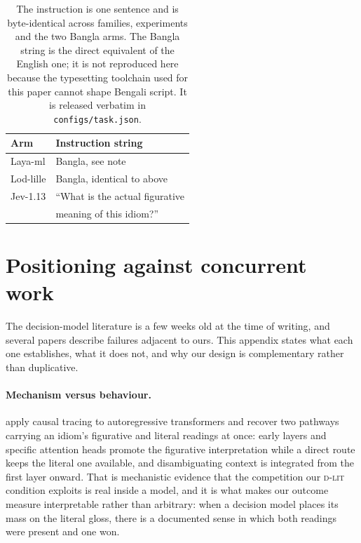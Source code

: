 \documentclass[11pt]{article}
\newcommand{\laya}[1]{\cellcolor{fLaya}#1}
\newcommand{\lod}[1]{\cellcolor{fLod}#1}
\newcommand{\jev}[1]{\cellcolor{fJev}#1}
\newcommand{\Dlit}{\textsc{d-lit}}
\begin{document}
\begin{table}[h]
\centering\small
\setlength{\tabcolsep}{4pt}
\begin{tabular}{ll}
\toprule
\textbf{Arm} & \textbf{Instruction string} \\
\midrule
\laya{Laya-ml} & \laya{Bangla, see note} \\
\lod{Lod-lille} & \lod{Bangla, identical to above} \\
\jev{Jev-1.13} & \jev{``What is the actual figurative} \\
\jev{} & \jev{meaning of this idiom?''} \\
\bottomrule
\end{tabular}
\caption{The instruction is one sentence and is byte-identical across families,
experiments and the two Bangla arms. The Bangla string is the direct equivalent
of the English one; it is not reproduced here because the typesetting toolchain
used for this paper cannot shape Bengali script. It is released verbatim in
\texttt{configs/task.json}.}
\label{tab:instr}
\end{table}

\section{Positioning against concurrent work}
\label{app:position}

The decision-model literature is a few weeks old at the time of writing, and
several papers describe failures adjacent to ours. This appendix states what
each one establishes, what it does not, and why our design is complementary
rather than duplicative.

\paragraph{Mechanism versus behaviour.} \citet{oh2026tug} apply causal tracing
to autoregressive transformers and recover two pathways carrying an idiom's
figurative and literal readings at once: early layers and specific attention
heads promote the figurative interpretation while a direct route keeps the
literal one available, and disambiguating context is integrated from the first
layer onward. That is mechanistic evidence that the competition our \Dlit{}
condition exploits is real inside a model, and it is what makes our outcome
measure interpretable rather than arbitrary: when a decision model places its
mass on the literal gloss, there is a documented sense in which both readings
were present and one won.
\end{document}
